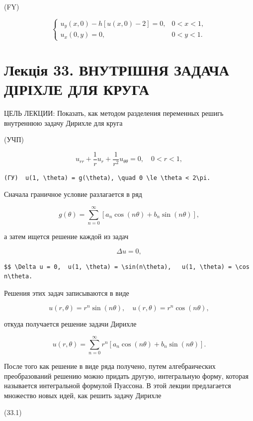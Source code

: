 \documentclass[
  ukrainian,
]{article}
\begin{document}
(FY)

\[
\begin{cases} u_y(x, 0) - h[u(x, 0) - 2] = 0, & 0 < x < 1, \\ u_x(0, y) = 0, & 0 < y < 1. \end{cases}
\]

\section{Лекція 33. ВНУТРІШНЯ ЗАДАЧА ДІРІХЛЕ ДЛЯ
КРУГА}\label{ux43bux435ux43aux446ux456ux44f-33.-ux432ux43dux443ux442ux440ux456ux448ux43dux44f-ux437ux430ux434ux430ux447ux430-ux434ux456ux440ux456ux445ux43bux435-ux434ux43bux44f-ux43aux440ux443ux433ux430}

ЦЕЛЬ ЛЕКЦИИ: Показать, как методом разделения переменных решигь
внутреннюю задачу Дирихле для круга

(УЧП)

\[
u_{rr} + \frac{1}{r} u_r + \frac{1}{r^2} u_{\theta\theta} = 0, \quad 0 < r < 1,
\]

\begin{verbatim}
(ГУ)  u(1, \theta) = g(\theta), \quad 0 \le \theta < 2\pi.
\end{verbatim}

Сначала граничное условие разлагается в ряд

\[
g(\theta) = \sum_{n=0}^{\infty} [a_n \cos(n\theta) + b_n \sin(n\theta)],
\]

а затем ищется решение каждой из задач

\[
\Delta u = 0,
\]

\begin{verbatim}
$$ \Delta u = 0,  u(1, \theta) = \sin(n\theta),   u(1, \theta) = \cos n\theta.
\end{verbatim}

Решения этих задач записываются в виде

\[
u(r, \theta) = r^n \sin(n\theta), \quad u(r, \theta) = r^n \cos(n\theta),
\]

откуда получается решение задачи Дирихле

\[
u(r, \theta) = \sum_{n=0}^{\infty} r^n [a_n \cos(n\theta) + b_n \sin(n\theta)].
\]

После того как решение в виде ряда получено, путем алгебраических
преобразований решению можно придать другую, интегральную форму, которая
называется интегральной формулой Пуассона. В этой лекции предлагается
множество новых идей, как решить задачу Дирихле

(33.1)
\end{document}
